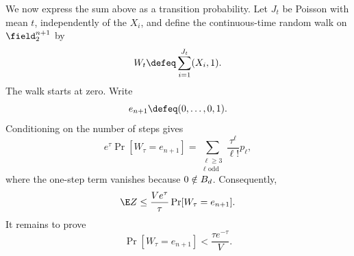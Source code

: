 We now express the sum above as a transition probability.  Let
$J_t$ be Poisson with mean $t$, independently of the $X_i$, and
define the continuous-time random walk on $\field_2^{n+1}$ by
$$
W_t\defeq\sum_{i=1}^{J_t}(X_i,1).
$$
The walk starts at zero.  Write
$$
e_{n+1}\defeq(0,\ldots,0,1).
$$
Conditioning on the number of steps gives
$$
e^\tau\Pr[W_\tau=e_{n+1}]
=
\sum_{\substack{\ell\ge3\\\ell\text{ odd}}}
\frac{\tau^\ell}{\ell!}p_\ell,
$$
where the one-step term vanishes because $0\notin B_d$.
Consequently,
$$
\E Z
\le
\frac{Ve^\tau}{\tau}\Pr[W_\tau=e_{n+1}].
$$
It remains to prove
$$
\Pr[W_\tau=e_{n+1}]
<\frac{\tau e^{-\tau}}{V}.
$$
